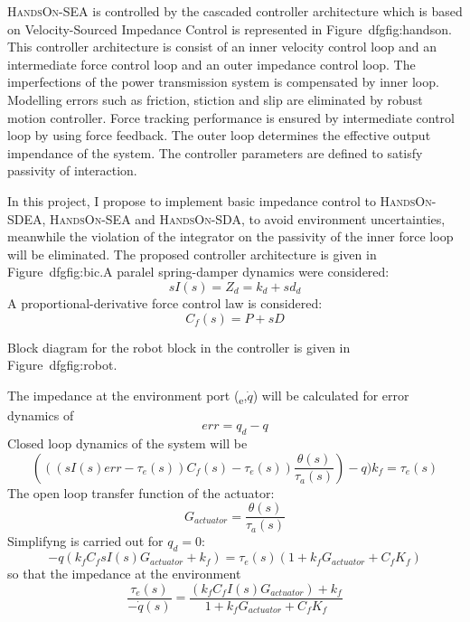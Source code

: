 \documentclass{article}
\begin{document}
\textsc{HandsOn-SEA} is controlled by the cascaded controller architecture which is based on Velocity-Sourced Impedance Control\cite{tagliamonte} is represented in Figure~dfgfig:handson. This controller architecture is consist of an inner velocity control loop and an intermediate force control loop and an outer impedance control loop. The imperfections of the power transmission system is compensated by inner loop. Modelling errors such as friction, stiction and slip are eliminated by robust motion controller. Force tracking performance is ensured by intermediate control loop by using force feedback. The outer loop determines the effective output impendance of the system. The controller parameters are defined to satisfy passivity of interaction\cite{tagliamonte}.



In this project, I propose to implement basic impedance control to \textsc{HandsOn-SDEA}, \textsc{HandsOn-SEA} and \textsc{HandsOn-SDA}, to avoid environment uncertainties, meanwhile the violation of the integrator on the passivity of the inner force loop will be eliminated\cite{pratt}. 
The proposed controller architecture is given in Figure~dfgfig:bic.A paralel spring-damper dynamics were considered:
\begin{equation}
sI(s)=Z_d=k_d+sd_d  
\end{equation}
A proportional-derivative force control law is considered:
\begin{equation}
C_f(s)=P+sD  
\end{equation}

Block diagram for the robot block in the controller is given in Figure~dfgfig:robot.

The impedance at the environment port (\texttau  \textsubscript{e},$\dot{q}$) will be calculated for error dynamics of
\begin{equation}
err=q_d-q
\end{equation}
Closed loop dynamics of the system will be
\begin{equation}
(((sI(s)err-\tau_{e}(s))C_f(s)-\tau_{e}(s))\frac{\theta(s)}{\tau_a(s)})-q)k_f=\tau_{e}(s)
\end{equation}
The open loop transfer function of the actuator:
\begin{equation}
G_{actuator}=\frac{\theta(s)}{\tau_a(s)}
\end{equation}
Simplifyng is carried out for $q_d=0$:
\begin{equation}
-q(k_fC_fsI(s)G_{actuator}+k_f)=\tau_{e}(s)(1+k_fG_{actuator}+C_fK_f)
\end{equation}
so that the impedance at the environment
\begin{equation}
\frac{\tau_e(s)}{-\Dot{q}(s)}=\frac{(k_fC_fI(s)G_{actuator})+k_f}{1+k_fG_{actuator}+C_fK_f}    
\end{equation}
\end{document}

